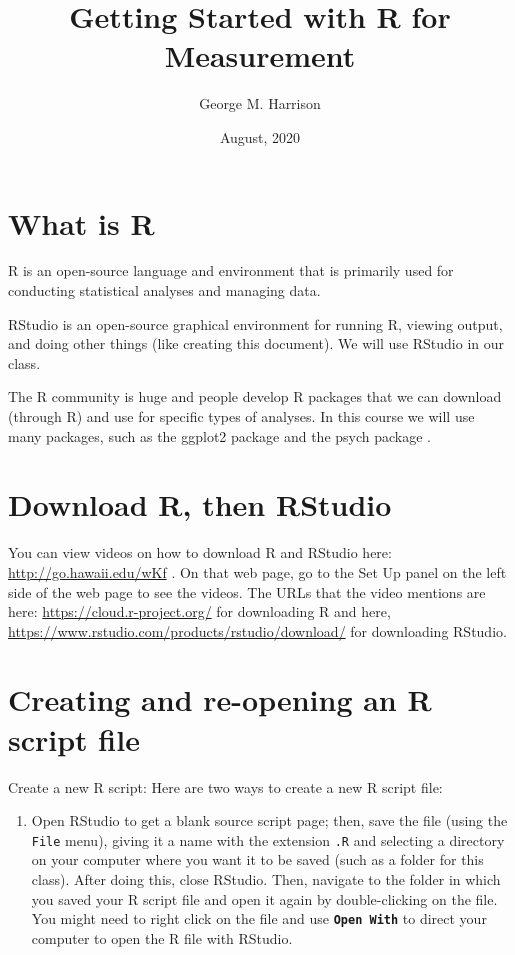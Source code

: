 \documentclass[
]{book}
\title{Getting Started with R for Measurement}
\author{George M. Harrison}
\date{August, 2020}
\providecommand{\tightlist}{%
  \setlength{\itemsep}{0pt}\setlength{\parskip}{0pt}}
\begin{document}
\maketitle

{
\setcounter{tocdepth}{1}
\tableofcontents
}
\hypertarget{what-is-r}{%
\chapter{What is R}\label{what-is-r}}

R \citep{R-base} is an open-source language and environment that is primarily used for conducting statistical analyses and managing data.

RStudio \citep{RStudio} is an open-source graphical environment for running R, viewing output, and doing other things (like creating this document). We will use RStudio in our class.

The R community is huge and people develop R packages that we can download (through R) and use for specific types of analyses. In this course we will use many packages, such as the ggplot2 package \citep{R-ggplot2} and the psych package \citep{R-psych}.

\hypertarget{download}{%
\chapter{Download R, then RStudio}\label{download}}

You can view videos on how to download R and RStudio here: \url{http://go.hawaii.edu/wKf} . On that web page, go to the Set Up panel on the left side of the web page to see the videos. The URLs that the video mentions are here: \url{https://cloud.r-project.org/} for downloading R and here, \url{https://www.rstudio.com/products/rstudio/download/} for downloading RStudio.

\hypertarget{creating}{%
\chapter{Creating and re-opening an R script file}\label{creating}}

Create a new R script: Here are two ways to create a new R script file:

\begin{enumerate}
\def\labelenumi{\arabic{enumi}.}
\tightlist
\item
  Open RStudio to get a blank source script page; then, save the file (using the \texttt{File} menu), giving it a name with the extension \texttt{.R} and selecting a directory on your computer where you want it to be saved (such as a folder for this class). After doing this, close RStudio. Then, navigate to the folder in which you saved your R script file and open it again by double-clicking on the file. You might need to right click on the file and use \textbf{\texttt{Open\ With}} to direct your computer to open the R file with RStudio.
\end{enumerate}
\end{document}
